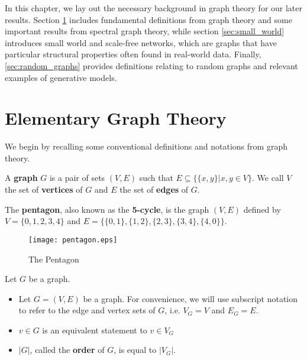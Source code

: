 In this chapter, we lay out the necessary background in graph theory for our later results. Section
\ref{sec:intro_graphs} includes fundamental definitions from graph theory and some important results
from spectral graph theory, while section \ref{sec:small_world} introduces small world and scale-free
networks, which are graphs that have particular structural properties often found in real-world data.
Finally, \ref{sec:random_graphs} provides definitions relating to random graphs and relevant examples
of generative models.

\section{Elementary Graph Theory}
\label{sec:intro_graphs}




We begin by recalling some conventional definitions and notations from graph
theory.

\begin{definition}
  A \textbf{graph} $G$ is a pair of sets $(V,E)$ such that
  $E \subseteq \{ \{x,y\} | x,y \in V \}$. We call $V$ the set of
  \textbf{vertices} of $G$ and $E$ the set of \textbf{edges} of $G$.
\end{definition}


\begin{example}
  The \textbf{pentagon}, also known as the \textbf{5-cycle}, is the graph $(V,E)$ defined by
  $V = \{0,1,2,3,4\}$ and $E = \{\{0,1\}, \{1,2\}, \{2,3\},\allowbreak \{3,4\}, \{4,0\}\}$.
\end{example}

\begin{figure}[H]
  \centering
  \texttt{[image: pentagon.eps]}
  \caption{The Pentagon}
  \label{fig:pentagon}
\end{figure}

\begin{remark}[Notation]
  Let $G$ be a graph.

  \begin{itemize}
  \item Let $G = (V,E)$ be a graph. For convenience, we will use subscript
    notation to refer to the edge and vertex sets of $G$, i.e. $V_G = V$ and
    $E_G = E$.
  \item $v \in G$ is an equivalent statement to $v \in V_G$
  \item $|G|$, called the \textbf{order} of $G$, is equal to $|V_G|$.
  \end{itemize}
\end{remark}

